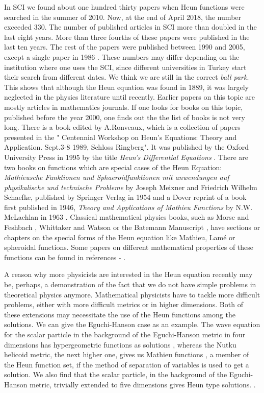 \documentclass{article}
\begin{document}
\noindent In SCI we found about one hundred thirty  papers when
Heun functions were searched in the summer of 2010. Now, at the end of
 April  2018, the number exceeded 330. The number of
published articles in SCI more than doubled in the last eight
years.  More than three fourths of these papers were published in
the last ten years. The rest of the papers were published between
1990 and 2005, except a single paper in 1986 \cite{valent}.  These
numbers may differ depending on the institution where one uses the
SCI, since different universities in Turkey start their search
from different dates. We think we are still in the correct
\emph{ball park}. This shows that although the Heun equation was
found in 1889, it was largely neglected in the physics literature
until recently. Earlier papers on this topic are mostly articles
in mathematics journals. If one looks for books on this topic, published before the year 2000, one
finds out the the list of books is not very long. There is a book
edited by A.Ronveaux, which is a collection of papers presented in
the " Centennial Workshop on Heun's Equations: Theory and
Application. Sept.3-8 1989, Schloss Ringberg". It was published by
the Oxford University Press in 1995 by the title \emph{Heun's
Differential Equations} \cite {Ronveaux}. There are two books on
functions which are special cases of the Heun Equation:
\textit{Mathieusche Funktionen und Sphaeroidfunktionen mit
anwendungen auf physikalische und technische Probleme } by Joseph
Meixner and Friedrich Wilhelm Schaefke, published by Springer
Verlag in 1954 \cite { Meixner} and a Dover reprint of a book
first published in 1946, \textit{Theory and Applications of
Mathieu Functions} by N.W. McLachlan in 1963 \cite{McLachlan}.
Classical mathematical physics books, such as Morse and Feshbach
\cite {Morse1}, Whittaker and Watson\cite{Whittaker} or the
Batemann Manuscript \cite{Bateman},  have sections or
chapters on the special forms of the Heun equation like Mathieu,
Lam\'{e} or spheroidal functions. Some papers on different
mathematical properties of these functions can be found in
references \cite{schafke}- \cite{birkandant}.


\noindent A reason why more physicists are interested in the Heun
equation recently may be, perhaps, a demonstration of the fact
that we do not have simple problems in theoretical physics
anymore. Mathematical physicists have to tackle more difficult
problems, either with more difficult metrics or in higher
dimensions. Both of these extensions may necessitate the use of
the Heun functions among the solutions. We can give the
Eguchi-Hanson case as an example. The wave equation for the scalar
particle  in the background of the Eguchi-Hanson metric
\cite{Eguchi}  in four dimensions has hypergeometric functions as
solutions \cite{Nuri}, whereas the Nutku helicoid
\cite{Nutku,Petzold} metric, the next higher one, gives us Mathieu
functions \cite{Yavuz2}, a member of the Heun function set, if the
method of separation of variables is used to get a solution.  We
also find that the scalar particle, in the background of the Eguchi-Hanson metric, trivially extended to
five dimensions gives Heun type solutions. 
\cite{tolga2}.
\end{document}
